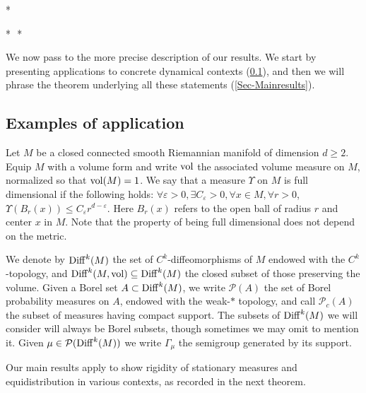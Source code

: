 \documentclass[11pt, leqno, fleqn]{amsart}
\def\eps{\varepsilon}
\newcommand{\SectionSymbol}{\textsection}
\newcommand{\cP}{{\mathcal P}}
\theoremstyle{definition}
\theoremstyle{definition}
\def \vol{  {\rm vol} }
\newcommand{\Diff}{{\rm Diff}}
\begin{document}
\bigskip
\begin{center}
*

*\,\,\,\,*
\end{center}
\bigskip

We now pass to the more precise description of our results. We start by presenting applications to  concrete dynamical contexts (\SectionSymbol  \ref{Sec-examples}), and then we will phrase the theorem underlying all these statements (\SectionSymbol \ref{Sec-Mainresults}). 


\subsection{Examples  of application} \label{Sec-examples}

Let $M$ be a closed  connected smooth Riemannian manifold of dimension $d\geq2$. Equip $M$ with a volume form and write  $\vol$ the associated volume  measure on $M$,  normalized so that $\vol(M)=1$. We  say that a measure $\Upsilon$ on $M$ is full dimensional if the following holds:  $\forall \varepsilon>0, \exists C_{\eps}>0, \forall x\in M, \forall r>0$, $ \Upsilon(B_{r}(x))\leq C_{\varepsilon}r^{d-\eps}.$ Here $B_{r}(x)$ refers to the open ball of radius $r$ and center $x$ in $M$.  Note that the property of being full dimensional does not depend on the metric. 

We denote by $\Diff^k(M)$ 
 the set of $C^k$-diffeomorphisms of $M$ endowed with the $C^k$-topology, and $\Diff^k(M, \vol)\subseteq \Diff^k(M)$ the closed subset of those  preserving the volume.  Given a Borel set $A\subset \Diff^k(M)$, we write $\cP(A)$  the set of Borel probability measures on $A$, endowed with the weak-$*$ topology, and call $\cP_{c}(A)$ the subset of measures having compact support. The subsets of $\Diff^k(M)$  we will consider will always be Borel subsets, though sometimes we may omit to mention it. Given $\mu\in \cP(\Diff^k(M))$ we write $\Gamma_{\mu}$ the semigroup generated by its support. 



\bigskip
	
Our main results  apply to show rigidity of stationary measures and equidistribution in various contexts, as recorded in the next theorem. 
   			
 
\end{document}
